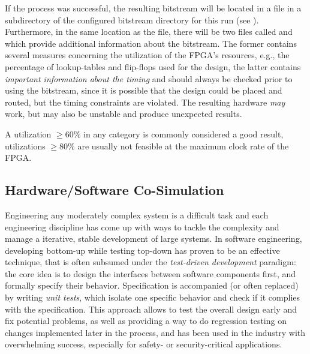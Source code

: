 \medskip
If the process was successful, the resulting bitstream will be located in a  file in a subdirectory of the configured bitstream directory for this run (see ).
Furthermore, in the same location as the  file, there will be two files called  and  which provide additional information about the bitstream.
The former contains several measures concerning the utilization of the FPGA's resources, e.g., the percentage of lookup-tables and flip-flops used for the design, the latter contains \emph{important information about the timing} and should always be checked prior to using the bitstream, since it is possible that the design could be placed and routed, but the timing constraints are violated.
The resulting hardware \emph{may} work, but may also be unstable and produce unexpected results.

\medskip
\begin{note}[Remark]
A utilization $\geq 60\%$ in any category is commonly considered a good result, utilizations $\geq 80\%$ are usually not feasible at the maximum clock rate of the FPGA.
\end{note}

\subsection*{Hardware/Software Co-Simulation}\label{sec:lls-sim}%
Engineering any moderately complex system is a difficult task and each engineering discipline has come up with ways to tackle the complexity and manage a iterative, stable development of large systems.
In software engineering, developing bottom-up while testing top-down has proven to be an effective technique, that is often subsumed under the \emph{test-driven development} paradigm:
the core idea is to design the interfaces between software components first, and formally specify their behavior. 
Specification is accompanied (or often replaced) by writing \emph{unit tests}, which isolate one specific behavior and check if it complies with the specification.
This approach allows to test the overall design early and fix potential problems, as well as providing a way to do regression testing on changes implemented later in the process, and has been used in the industry with overwhelming success, especially for safety- or security-critical applications.

